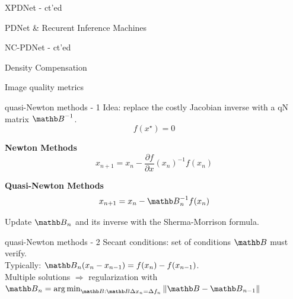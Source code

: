 \begin{frame}{XPDNet - ct'ed}
\end{frame}

\begin{frame}{PDNet \& Recurent Inference Machines}

\end{frame}

\begin{frame}{NC-PDNet - ct'ed}
\end{frame}

\begin{frame}{Density Compensation}

\end{frame}

\begin{frame}{Image quality metrics}

\end{frame}

\begin{frame}{quasi-Newton methods - 1}
    Idea: replace the costly Jacobian inverse with a qN matrix $\Bb^{-1}$.\\
    \begin{equation*}
        f(x^\star) = 0
    \end{equation*}
    \begin{multicols}{2}

            \begin{center}
                \textbf{Newton Methods}
                \begin{equation*}
                    x_{n+1} = x_n -\frac{\partial f}{\partial x}(x_n)^{-1}f(x_n)
                \end{equation*}
            \end{center}
            \newpage
            \begin{center}
                \textbf{Quasi-Newton Methods}
                \begin{equation*}
                    x_{n+1} = x_n -\Bb_n^{-1}f(x_n)
                \end{equation*}
            \end{center}
            Update $\Bb_n$ and its inverse with the Sherma-Morrison formula.
    \end{multicols}
\end{frame}

\begin{frame}{quasi-Newton methods - 2}
    Secant conditions: set of conditions $\Bb$ must verify.\\
    Typically: $\Bb_n(x_n - x_{n-1}) = f(x_n) - f(x_{n-1})$.\\
    Multiple solutions $\Rightarrow$ regularization with $\Bb_n = \argmin_{\Bb: \Bb \Delta x_n = \Delta f_n} \|\Bb - \Bb_{n-1}\|$
\end{frame}

